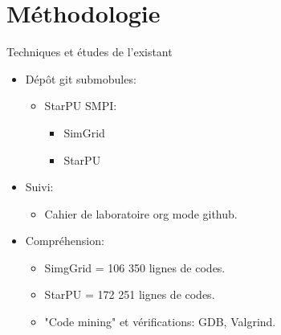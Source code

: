 \documentclass[11pt,xcolor=dvipsnames,presentation]{beamer}
\begin{document}
\section{Méthodologie}
\label{sec-4}
\begin{frame}[label=sec-4-1]{Techniques et études de l'existant}
\begin{itemize}
\item Dépôt git submobules:
\begin{itemize}
\item StarPU SMPI:
\begin{itemize}
\item SimGrid
\item StarPU
\end{itemize}
\end{itemize}
\item Suivi:
\begin{itemize}
\item Cahier de laboratoire org mode github.
\end{itemize}
\item Compréhension:
\begin{itemize}
\item SimgGrid = 106 350 lignes de codes.
\item StarPU = 172 251 lignes de codes.
\item "Code mining" et vérifications: GDB, Valgrind.
\end{itemize}
\end{itemize}
\end{frame}
\end{document}
